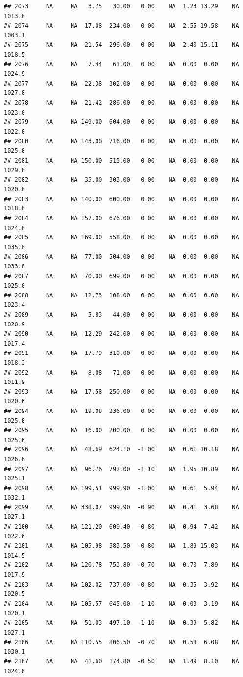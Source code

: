 \documentclass{article}\usepackage{graphicx, color}
\makeatletter
\newenvironment{kframe}{%
 \def\at@end@of@kframe{}%
 \ifinner\ifhmode%
  \def\at@end@of@kframe{\end{minipage}}%
  \begin{minipage}{\columnwidth}%
 \fi\fi%
 \def\FrameCommand##1{\hskip\@totalleftmargin \hskip-\fboxsep
 \colorbox{shadecolor}{##1}\hskip-\fboxsep
     \hskip-\linewidth \hskip-\@totalleftmargin \hskip\columnwidth}%
 \MakeFramed {\advance\hsize-\width
   \@totalleftmargin\z@ \linewidth\hsize
   \@setminipage}}%
 {\par\unskip\endMakeFramed%
 \at@end@of@kframe}
\newenvironment{knitrout}{}{} %
\makeatother
\begin{document}
\begin{knitrout}
\begin{kframe}
\begin{verbatim}
## 2073     NA     NA   3.75   30.00   0.00    NA  1.23 13.29    NA 1013.0
## 2074     NA     NA  17.08  234.00   0.00    NA  2.55 19.58    NA 1003.1
## 2075     NA     NA  21.54  296.00   0.00    NA  2.40 15.11    NA 1018.5
## 2076     NA     NA   7.44   61.00   0.00    NA  0.00  0.00    NA 1024.9
## 2077     NA     NA  22.38  302.00   0.00    NA  0.00  0.00    NA 1027.8
## 2078     NA     NA  21.42  286.00   0.00    NA  0.00  0.00    NA 1023.0
## 2079     NA     NA 149.00  604.00   0.00    NA  0.00  0.00    NA 1022.0
## 2080     NA     NA 143.00  716.00   0.00    NA  0.00  0.00    NA 1025.0
## 2081     NA     NA 150.00  515.00   0.00    NA  0.00  0.00    NA 1029.0
## 2082     NA     NA  35.00  303.00   0.00    NA  0.00  0.00    NA 1020.0
## 2083     NA     NA 140.00  600.00   0.00    NA  0.00  0.00    NA 1018.0
## 2084     NA     NA 157.00  676.00   0.00    NA  0.00  0.00    NA 1024.0
## 2085     NA     NA 169.00  558.00   0.00    NA  0.00  0.00    NA 1035.0
## 2086     NA     NA  77.00  504.00   0.00    NA  0.00  0.00    NA 1033.0
## 2087     NA     NA  70.00  699.00   0.00    NA  0.00  0.00    NA 1025.0
## 2088     NA     NA  12.73  108.00   0.00    NA  0.00  0.00    NA 1023.4
## 2089     NA     NA   5.83   44.00   0.00    NA  0.00  0.00    NA 1020.9
## 2090     NA     NA  12.29  242.00   0.00    NA  0.00  0.00    NA 1017.4
## 2091     NA     NA  17.79  310.00   0.00    NA  0.00  0.00    NA 1018.3
## 2092     NA     NA   8.08   71.00   0.00    NA  0.00  0.00    NA 1011.9
## 2093     NA     NA  17.58  250.00   0.00    NA  0.00  0.00    NA 1020.6
## 2094     NA     NA  19.08  236.00   0.00    NA  0.00  0.00    NA 1025.0
## 2095     NA     NA  16.00  200.00   0.00    NA  0.00  0.00    NA 1025.6
## 2096     NA     NA  48.69  624.10  -1.00    NA  0.61 10.18    NA 1026.6
## 2097     NA     NA  96.76  792.00  -1.10    NA  1.95 10.89    NA 1025.1
## 2098     NA     NA 199.51  999.90  -1.00    NA  0.61  5.94    NA 1032.1
## 2099     NA     NA 338.07  999.90  -0.90    NA  0.41  3.68    NA 1027.1
## 2100     NA     NA 121.20  609.40  -0.80    NA  0.94  7.42    NA 1022.6
## 2101     NA     NA 105.98  583.50  -0.80    NA  1.89 15.03    NA 1014.5
## 2102     NA     NA 120.78  753.80  -0.70    NA  0.70  7.89    NA 1017.9
## 2103     NA     NA 102.02  737.00  -0.80    NA  0.35  3.92    NA 1020.5
## 2104     NA     NA 105.57  645.00  -1.10    NA  0.03  3.19    NA 1020.1
## 2105     NA     NA  51.03  497.10  -1.10    NA  0.39  5.82    NA 1027.1
## 2106     NA     NA 110.55  806.50  -0.70    NA  0.58  6.08    NA 1030.1
## 2107     NA     NA  41.60  174.80  -0.50    NA  1.49  8.10    NA 1024.0

\end{verbatim}
\end{kframe}
\end{knitrout}
\end{document}
